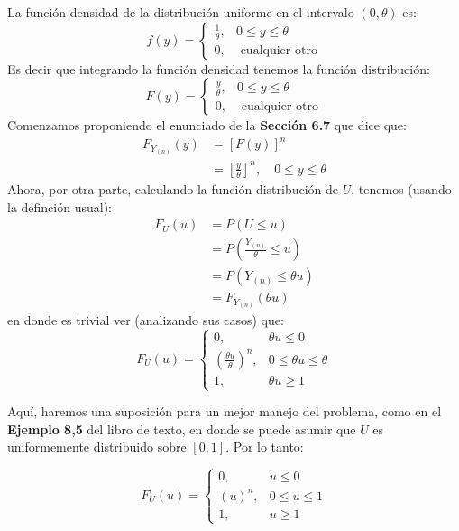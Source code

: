 \begin{enumerate}
\begin{solution}
La función densidad de la distribución uniforme en el intervalo $(0,\theta)$ es: 
$$f(y)= \begin{cases}\frac{1}{\theta}, & 0\leq y\leq \theta\\ 0, &\text{ cualquier otro}\end{cases}$$
Es decir que integrando la función densidad tenemos la función distribución: 
$$F(y)= \begin{cases}\frac{y}{\theta}, & 0\leq y\leq \theta\\ 0, &\text{ cualquier otro}\end{cases}$$
Comenzamos proponiendo el enunciado de la \textbf{Sección 6.7} que dice que:
\begin{align*}
    F_{Y_{(n)}}(y) & = [F(y)]^n\\
                &= \left[\frac{y}{\theta}\right]^n, \quad 0\leq y\leq \theta 
\end{align*}
Ahora, por otra parte, calculando la función distribución de $U$, tenemos (usando la definción usual): 
\begin{align*}
    F_U(u) &= P(U\leq u)\\
           &= P\left(\frac{Y_{(n)}}{\theta}\leq u\right)\\
           &= P\left(Y_{(n)}\leq \theta u\right)\\
           &= F_{Y_{(n)}}(\theta u) 
\end{align*}
en donde es trivial ver (analizando sus casos) que: 
$$F_U(u)=\begin{cases}0, & \theta u\leq0\\
\left(\frac{\theta u}{\theta}\right)^n, & 0\leq \theta u\leq \theta\\
1, & \theta u \geq 1
\end{cases}$$

Aquí, haremos una suposición para un mejor manejo del problema, como en el \textbf{Ejemplo 8,5} del libro de texto, en donde se puede asumir que $U$ es uniformemente distribuido sobre $[0,1]$. Por lo tanto: 

$$F_U(u)=\begin{cases}0, &  u\leq0\\
\left(u\right)^n, & 0\leq u\leq 1\\
1, &  u \geq 1
\end{cases}$$
    

\end{solution}
\end{enumerate}

